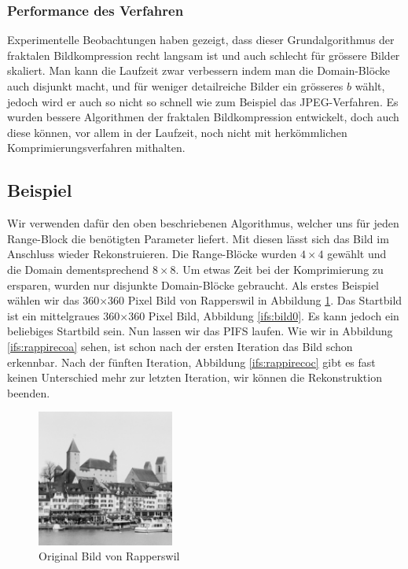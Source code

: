 \subsubsection{Performance des Verfahren}
Experimentelle Beobachtungen haben gezeigt, dass dieser Grundalgorithmus der fraktalen Bildkompression recht langsam ist und auch schlecht für grössere Bilder skaliert.
Man kann die Laufzeit zwar verbessern indem man die Domain-Blöcke auch disjunkt macht, und für weniger detailreiche Bilder ein grösseres $b$ wählt, jedoch wird er auch so nicht so schnell wie zum Beispiel das JPEG-Verfahren.
Es wurden bessere Algorithmen der fraktalen Bildkompression entwickelt, doch auch diese können, vor allem in der Laufzeit, noch nicht mit herkömmlichen Komprimierungsverfahren mithalten.

\subsection{Beispiel}
Wir verwenden dafür den oben beschriebenen Algorithmus, welcher uns für jeden Range-Block die benötigten Parameter liefert.
Mit diesen lässt sich das Bild im Anschluss wieder Rekonstruieren.
Die Range-Blöcke wurden $4\times4$ gewählt und die Domain dementsprechend $8\times8$.
Um etwas Zeit bei der Komprimierung zu ersparen, wurden nur disjunkte Domain-Blöcke gebraucht.
Als erstes Beispiel wählen wir das 360$\times$360 Pixel Bild von Rapperswil in Abbildung \ref{ifs:original}.
Das Startbild ist ein mittelgraues 360$\times$360 Pixel Bild, Abbildung \ref{ifs:bild0}.
Es kann jedoch ein beliebiges Startbild sein.
Nun lassen wir das PIFS laufen.
Wie wir in Abbildung \ref{ifs:rappirecoa} sehen, ist schon nach der ersten Iteration das Bild schon erkennbar.
Nach der fünften Iteration, Abbildung \ref{ifs:rappirecoc} gibt es fast keinen Unterschied mehr zur letzten Iteration, wir können die Rekonstruktion beenden.
\begin{figure}	
	\centering
	\includegraphics[width=0.4\textwidth]{papers/ifs/images/original}
	\caption{Original Bild von Rapperswil}
	\label{ifs:original}
\end{figure}
